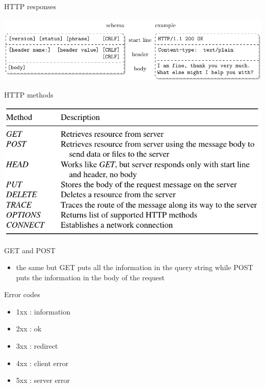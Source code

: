 \documentclass[ignorenonframetext,]{beamer}
\providecommand{\tightlist}{%
  \setlength{\itemsep}{0pt}\setlength{\parskip}{0pt}}
\begin{document}
\begin{frame}{HTTP responses}

\includegraphics{fig/httpresponse.pdf}

\end{frame}

\begin{frame}{HTTP methods}

\includegraphics{fig/httpmethods.png}

\end{frame}

\begin{frame}{GET and POST}

\begin{itemize}
\tightlist
\item
  the same but GET puts all the information in the query string while
  POST puts the information in the body of the request
\end{itemize}

\end{frame}

\begin{frame}{Error codes}

\begin{itemize}
\tightlist
\item
  1xx : information
\item
  2xx : ok
\item
  3xx : redirect
\item
  4xx : client error
\item
  5xx : server error
\end{itemize}

\end{frame}
\end{document}
